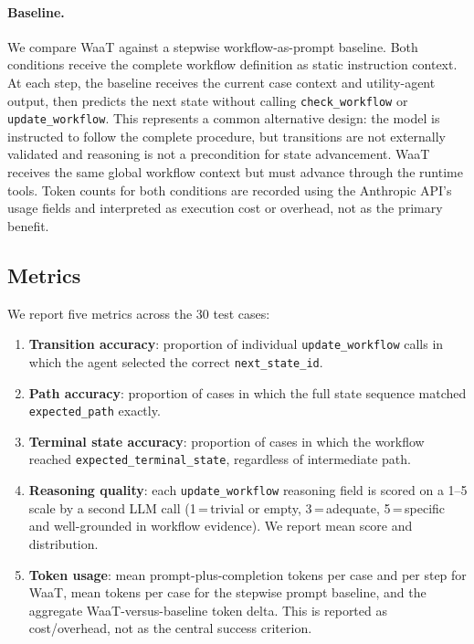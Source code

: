\documentclass[10pt,conference]{IEEEtran}
\begin{document}
\paragraph{Baseline.}
We compare WaaT against a stepwise workflow-as-prompt baseline.
Both conditions receive the complete workflow definition as static
instruction context.  At each step, the baseline receives the
current case context and utility-agent output, then predicts the
next state without calling \texttt{check\_workflow} or
\texttt{update\_workflow}.  This represents a common alternative
design: the model is instructed to follow the complete procedure,
but transitions are not externally validated and reasoning is not
a precondition for state advancement.  WaaT receives the same
global workflow context but must advance through the runtime tools.
Token counts for both conditions are recorded using the Anthropic
API's usage fields and interpreted as execution cost or overhead,
not as the primary benefit.

\subsection{Metrics}

We report five metrics across the 30 test cases:

\begin{enumerate}
  \item \textbf{Transition accuracy}: proportion of individual
        \texttt{update\_workflow} calls in which the agent selected
        the correct \texttt{next\_state\_id}.
  \item \textbf{Path accuracy}: proportion of cases in which the
        full state sequence matched \texttt{expected\_path} exactly.
  \item \textbf{Terminal state accuracy}: proportion of cases in
        which the workflow reached \texttt{expected\_terminal\_state},
        regardless of intermediate path.
  \item \textbf{Reasoning quality}: each \texttt{update\_workflow}
        reasoning field is scored on a 1--5 scale by a second LLM
        call (1\,=\,trivial or empty, 3\,=\,adequate,
        5\,=\,specific and well-grounded in workflow evidence).
        We report mean score and distribution.
  \item \textbf{Token usage}: mean prompt-plus-completion
        tokens per case and per step for WaaT, mean tokens per
        case for the stepwise prompt baseline, and the aggregate
        WaaT-versus-baseline token delta.  This is reported as
        cost/overhead, not as the central success criterion.
\end{enumerate}
\end{document}
